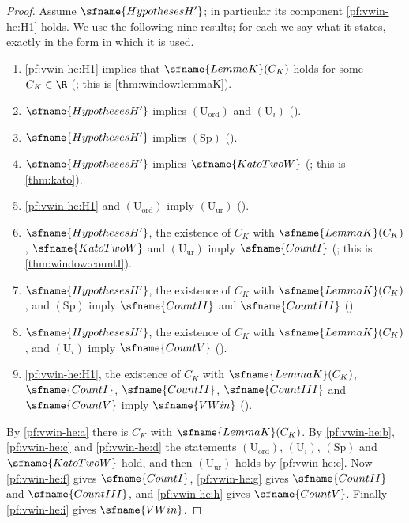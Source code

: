 \begin{proof}
Assume $\sfname{HypothesesH'}$; in particular its component \ref{pf:vwin-he:H1} holds. We use the following nine
results; for each we say what it states, exactly in the form in which it is used.
\begin{enumerate}[label=(\alph*)]
\item\label{pf:vwin-he:a} \ref{pf:vwin-he:H1} implies that $\sfname{LemmaK}(C_K)$ holds for some $C_K\in\R$
(; this is \cref{thm:window:lemmaK}).
\item\label{pf:vwin-he:b} $\sfname{HypothesesH'}$ implies $(\mathrm{U}_{\mathrm{ord}})$ and $(\mathrm{U}_i)$
().
\item\label{pf:vwin-he:c} $\sfname{HypothesesH'}$ implies $(\mathrm{Sp})$
().
\item\label{pf:vwin-he:d} $\sfname{HypothesesH'}$ implies $\sfname{KatoTwoW}$
(; this is \cref{thm:kato}).
\item\label{pf:vwin-he:e} \ref{pf:vwin-he:H1} and $(\mathrm{U}_{\mathrm{ord}})$ imply $(\mathrm{U}_{\mathrm{ur}})$
().
\item\label{pf:vwin-he:f} $\sfname{HypothesesH'}$, the existence of $C_K$ with $\sfname{LemmaK}(C_K)$,
$\sfname{KatoTwoW}$ and $(\mathrm{U}_{\mathrm{ur}})$ imply $\sfname{CountI}$
(; this is \cref{thm:window:countI}).
\item\label{pf:vwin-he:g} $\sfname{HypothesesH'}$, the existence of $C_K$ with $\sfname{LemmaK}(C_K)$, and
$(\mathrm{Sp})$ imply $\sfname{CountII}$ and $\sfname{CountIII}$
().
\item\label{pf:vwin-he:h} $\sfname{HypothesesH'}$, the existence of $C_K$ with $\sfname{LemmaK}(C_K)$, and
$(\mathrm{U}_i)$ imply $\sfname{CountV}$ ().
\item\label{pf:vwin-he:i} \ref{pf:vwin-he:H1}, the existence of $C_K$ with $\sfname{LemmaK}(C_K)$, $\sfname{CountI}$,
$\sfname{CountII}$, $\sfname{CountIII}$ and $\sfname{CountV}$ imply $\sfname{VWin}$
().
\end{enumerate}
By \ref{pf:vwin-he:a} there is $C_K$ with $\sfname{LemmaK}(C_K)$. By \ref{pf:vwin-he:b}, \ref{pf:vwin-he:c} and
\ref{pf:vwin-he:d} the statements $(\mathrm{U}_{\mathrm{ord}})$, $(\mathrm{U}_i)$, $(\mathrm{Sp})$ and
$\sfname{KatoTwoW}$ hold, and then $(\mathrm{U}_{\mathrm{ur}})$ holds by \ref{pf:vwin-he:e}. Now \ref{pf:vwin-he:f}
gives $\sfname{CountI}$, \ref{pf:vwin-he:g} gives $\sfname{CountII}$ and $\sfname{CountIII}$, and \ref{pf:vwin-he:h}
gives $\sfname{CountV}$. Finally \ref{pf:vwin-he:i} gives $\sfname{VWin}$.
\end{proof}

